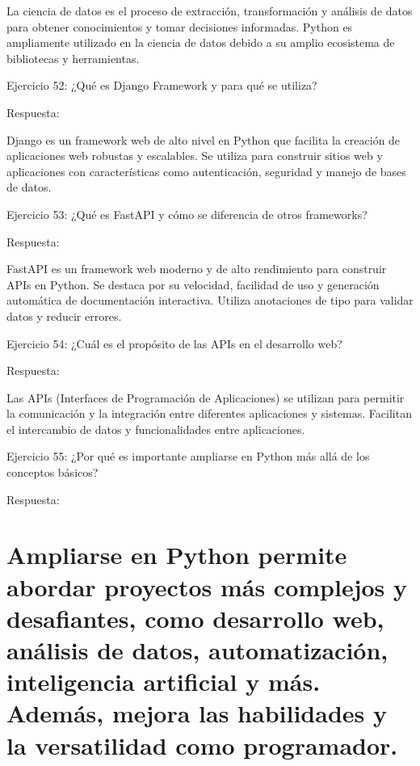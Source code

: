 \documentclass[
  a4paper,
  DIV=11,
  numbers=noendperiod,
  onepage,
  openany]{scrreprt}
\begin{document}
La ciencia de datos es el proceso de extracción, transformación y
análisis de datos para obtener conocimientos y tomar decisiones
informadas. Python es ampliamente utilizado en la ciencia de datos
debido a su amplio ecosistema de bibliotecas y herramientas.

Ejercicio 52: ¿Qué es Django Framework y para qué se utiliza?

Respuesta:

Django es un framework web de alto nivel en Python que facilita la
creación de aplicaciones web robustas y escalables. Se utiliza para
construir sitios web y aplicaciones con características como
autenticación, seguridad y manejo de bases de datos.

Ejercicio 53: ¿Qué es FastAPI y cómo se diferencia de otros frameworks?

Respuesta:

FastAPI es un framework web moderno y de alto rendimiento para construir
APIs en Python. Se destaca por su velocidad, facilidad de uso y
generación automática de documentación interactiva. Utiliza anotaciones
de tipo para validar datos y reducir errores.

Ejercicio 54: ¿Cuál es el propósito de las APIs en el desarrollo web?

Respuesta:

Las APIs (Interfaces de Programación de Aplicaciones) se utilizan para
permitir la comunicación y la integración entre diferentes aplicaciones
y sistemas. Facilitan el intercambio de datos y funcionalidades entre
aplicaciones.

Ejercicio 55: ¿Por qué es importante ampliarse en Python más allá de los
conceptos básicos?

Respuesta:

\hypertarget{ampliarse-en-python-permite-abordar-proyectos-muxe1s-complejos-y-desafiantes-como-desarrollo-web-anuxe1lisis-de-datos-automatizaciuxf3n-inteligencia-artificial-y-muxe1s.-ademuxe1s-mejora-las-habilidades-y-la-versatilidad-como-programador.}{%
\chapter{Ampliarse en Python permite abordar proyectos más complejos y
desafiantes, como desarrollo web, análisis de datos, automatización,
inteligencia artificial y más. Además, mejora las habilidades y la
versatilidad como
programador.}\label{ampliarse-en-python-permite-abordar-proyectos-muxe1s-complejos-y-desafiantes-como-desarrollo-web-anuxe1lisis-de-datos-automatizaciuxf3n-inteligencia-artificial-y-muxe1s.-ademuxe1s-mejora-las-habilidades-y-la-versatilidad-como-programador.}}
\end{document}
